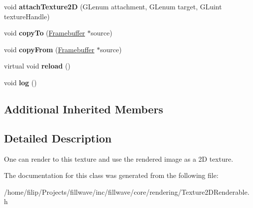 \begin{DoxyCompactItemize}
\item 
\hypertarget{classfillwave_1_1core_1_1Texture2DRenderable_a9bebbeaf7cc548b337bec4f23e9bae7b}{}void {\bfseries attach\+Texture2\+D} (G\+Lenum attachment, G\+Lenum target, G\+Luint texture\+Handle)\label{classfillwave_1_1core_1_1Texture2DRenderable_a9bebbeaf7cc548b337bec4f23e9bae7b}

\item 
\hypertarget{classfillwave_1_1core_1_1Texture2DRenderable_aab1b815fcb89e31422dc86e17da391c5}{}void {\bfseries copy\+To} (\hyperlink{classfillwave_1_1core_1_1Framebuffer}{Framebuffer} $\ast$source)\label{classfillwave_1_1core_1_1Texture2DRenderable_aab1b815fcb89e31422dc86e17da391c5}

\item 
\hypertarget{classfillwave_1_1core_1_1Texture2DRenderable_aeaaba0918828b2668ef60ed020443a96}{}void {\bfseries copy\+From} (\hyperlink{classfillwave_1_1core_1_1Framebuffer}{Framebuffer} $\ast$source)\label{classfillwave_1_1core_1_1Texture2DRenderable_aeaaba0918828b2668ef60ed020443a96}

\item 
\hypertarget{classfillwave_1_1core_1_1Texture2DRenderable_a3940154d14eb31a942f9d10a62c0de2b}{}virtual void {\bfseries reload} ()\label{classfillwave_1_1core_1_1Texture2DRenderable_a3940154d14eb31a942f9d10a62c0de2b}

\item 
\hypertarget{classfillwave_1_1core_1_1Texture2DRenderable_a8a548f5ccb3e20dcd01cfcc4df878ab7}{}void {\bfseries log} ()\label{classfillwave_1_1core_1_1Texture2DRenderable_a8a548f5ccb3e20dcd01cfcc4df878ab7}

\end{DoxyCompactItemize}
\subsection*{Additional Inherited Members}


\subsection{Detailed Description}
One can render to this texture and use the rendered image as a 2\+D texture. 

The documentation for this class was generated from the following file\+:\begin{DoxyCompactItemize}
\item 
/home/filip/\+Projects/fillwave/inc/fillwave/core/rendering/Texture2\+D\+Renderable.\+h\end{DoxyCompactItemize}

